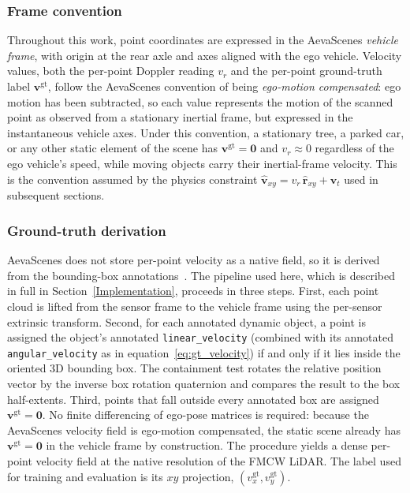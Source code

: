 \documentclass[a4paper,12pt]{article}
\begin{document}
\subsubsection{Frame convention}

Throughout this work, point coordinates are expressed in the AevaScenes \emph{vehicle frame}, with origin at the rear axle and axes aligned with the ego vehicle. Velocity values, both the per-point Doppler reading $v_r$ and the per-point ground-truth label $\mathbf{v}^{\mathrm{gt}}$, follow the AevaScenes convention of being \emph{ego-motion compensated}: ego motion has been subtracted, so each value represents the motion of the scanned point as observed from a stationary inertial frame, but expressed in the instantaneous vehicle axes. Under this convention, a stationary tree, a parked car, or any other static element of the scene has $\mathbf{v}^{\mathrm{gt}} = \mathbf{0}$ and $v_r \approx 0$ regardless of the ego vehicle's speed, while moving objects carry their inertial-frame velocity. This is the convention assumed by the physics constraint $\hat{\mathbf{v}}_{xy} = v_r\,\hat{\mathbf{r}}_{xy} + \mathbf{v}_t$ used in subsequent sections.

\subsubsection{Ground-truth derivation}

AevaScenes does not store per-point velocity as a native field, so it is derived from the bounding-box annotations~\cite{aeva2025aevascenes}. The pipeline used here, which is described in full in Section~\ref{Implementation}, proceeds in three steps. First, each point cloud is lifted from the sensor frame to the vehicle frame using the per-sensor extrinsic transform. Second, for each annotated dynamic object, a point is assigned the object's annotated \texttt{linear\_velocity} (combined with its annotated \texttt{angular\_velocity} as in equation~\eqref{eq:gt_velocity}) if and only if it lies inside the oriented 3D bounding box. The containment test rotates the relative position vector by the inverse box rotation quaternion and compares the result to the box half-extents. Third, points that fall outside every annotated box are assigned $\mathbf{v}^{\mathrm{gt}} = \mathbf{0}$. No finite differencing of ego-pose matrices is required: because the AevaScenes velocity field is ego-motion compensated, the static scene already has $\mathbf{v}^{\mathrm{gt}} = \mathbf{0}$ in the vehicle frame by construction. The procedure yields a dense per-point velocity field at the native resolution of the FMCW LiDAR. The label used for training and evaluation is its $xy$ projection, $(v_x^{\mathrm{gt}}, v_y^{\mathrm{gt}})$.
\end{document}
